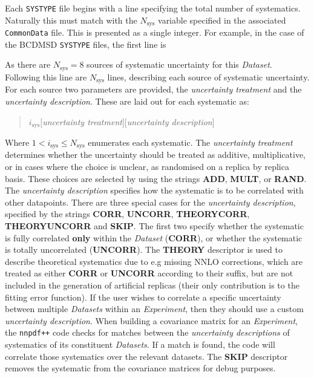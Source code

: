\documentclass[11pt]{article}
\begin{document}
Each {\tt SYSTYPE} file begins with a line specifying the total number of
systematics. Naturally this must match with the $N_{\text{sys}}$ variable
specified in the associated {\tt CommonData} file. This is presented as a single
integer. For example, in the case of the BCDMSD {\tt SYSTYPE} files, the first line is
\begin{quotation}
\end{quotation}
As there are $N_{\text{sys}}=8$ sources of systematic uncertainty for this
\emph{Dataset}. Following this line are $N_{\text{sys}}$ lines, describing each
source of systematic uncertainty. For each source two parameters are provided,
the \emph{uncertainty treatment} and the \emph{uncertainty description}. These
are laid out for each systematic as:
\begin{quotation}\noindent
$i_{\text{sys}}$\quad $[$\emph{uncertainty treatment}$]$\quad $[$\emph{uncertainty description}$]$
\end{quotation}
Where $1< i_{\text{sys}} \leq N_{\mathrm{sys}}$ enumerates each systematic. The
\emph{uncertainty treatment} determines whether the uncertainty should be
treated as additive, multiplicative, or in cases where the choice is unclear, as
randomised on a replica by replica basis. These choices are selected by using
the strings \textbf{ADD}, \textbf{MULT}, or \textbf{RAND}. The \emph{uncertainty
description} specifies how the systematic is to be correlated with other
datapoints. There are three special cases for the \emph{uncertainty
description}, specified by the strings \textbf{CORR}, \textbf{UNCORR},
\textbf{THEORYCORR}, \textbf{THEORYUNCORR} and \textbf{SKIP}. The first two
specify whether the systematic is fully correlated \textbf{only} within the
\emph{Dataset} (\textbf{CORR}), or whether the systematic is totally
uncorrelated (\textbf{UNCORR}). The \textbf{THEORY} descriptor is used to
describe theoretical systematics due to e.g missing NNLO corrections, which are
treated as either \textbf{CORR} or \textbf{UNCORR} according to their suffix,
but are not included in the generation of artificial replicas (their only
contribution is to the fitting error function). If the user wishes to correlate
a specific uncertainty between multiple \emph{Datasets} within an
\emph{Experiment}, then they should use a custom \emph{uncertainty description}.
When building a covariance matrix for an \emph{Experiment}, the {\tt nnpdf++}
code checks for matches between the \emph{uncertainty descriptions} of
systematics of its constituent \emph{Datasets}. If a match is found, the code
will correlate those systematics over the relevant datasets. The \textbf{SKIP}
descriptor removes the systematic from the covariance matrices for debug
purposes.
\end{document}
